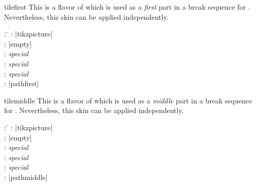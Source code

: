 \clearpage
\begin{docSkin}[doc new=2016-02-25]{tilefirst}
This is a flavor of  which is used as a \emph{first} part
in a break sequence for .
Nevertheless, this skin can be applied independently.
\begin{tcolorbox}[skintable=tilefirst]
  \begin{tabbing}
    : \=\kill
    :  \> |tikzpicture|\\ 
    :           \> |empty|\\
    : \> \emph{special}\\ 
    :        \> \emph{special}\\
    :    \> \emph{special}\\
    :           \> |pathfirst|
  \end{tabbing}
\end{tcolorbox}
\end{docSkin}

\begin{dispExample}
\end{dispExample}


\clearpage
\begin{docSkin}[doc new=2016-02-25]{tilemiddle}
This is a flavor of  which is used as a \emph{middle} part
in a break sequence for .
Nevertheless, this skin can be applied independently.
\begin{tcolorbox}[skintable=tilemiddle]
  \begin{tabbing}
    : \=\kill
    :  \> |tikzpicture|\\ 
    :           \> |empty|\\
    : \> \emph{special}\\ 
    :        \> \emph{special}\\
    :    \> \emph{special}\\
    :           \> |pathmiddle|
  \end{tabbing}
\end{tcolorbox}
\end{docSkin}


